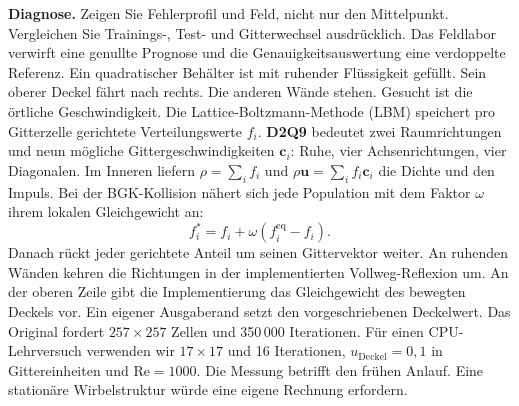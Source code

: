 \par\textsf{\bfseries\color{sea}Diagnose.} Zeigen Sie Fehlerprofil und Feld, nicht nur den Mittelpunkt. Vergleichen Sie Trainings-, Test- und Gitterwechsel ausdrücklich. Das Feldlabor verwirft eine genullte Prognose und die Genauigkeitsauswertung eine verdoppelte Referenz.
Ein quadratischer Behälter ist mit ruhender Flüssigkeit gefüllt. Sein oberer Deckel fährt nach rechts. Die anderen Wände stehen. Gesucht ist die örtliche Geschwindigkeit. Die Lattice-Boltzmann-Methode (LBM) speichert pro Gitterzelle gerichtete Verteilungswerte \(f_i\). \textbf{D2Q9} bedeutet zwei Raumrichtungen und neun mögliche Gittergeschwindigkeiten \(\mathbf c_i\): Ruhe, vier Achsenrichtungen, vier Diagonalen.
Im Inneren liefern \(\rho=\sum_i f_i\) und \(\rho\mathbf u=\sum_i f_i\mathbf c_i\) die Dichte und den Impuls. Bei der BGK-Kollision nähert sich jede Population mit dem Faktor \(\omega\) ihrem lokalen Gleichgewicht an:
\[
 f_i^*=f_i+\omega(f_i^{\mathrm{eq}}-f_i).
\]
Danach rückt jeder gerichtete Anteil um seinen Gittervektor weiter. An ruhenden Wänden kehren die Richtungen in der implementierten Vollweg-Reflexion um. An der oberen Zeile gibt die Implementierung das Gleichgewicht des bewegten Deckels vor. Ein eigener Ausgaberand setzt den vorgeschriebenen Deckelwert.
Das Original fordert \(257\times257\) Zellen und 350\,000 Iterationen. Für einen CPU-Lehrversuch verwenden wir \(17\times17\) und 16 Iterationen, \(u_\mathrm{Deckel}=0{,}1\) in Gittereinheiten und \(\mathrm{Re}=1000\). Die Messung betrifft den frühen Anlauf. Eine stationäre Wirbelstruktur würde eine eigene Rechnung erfordern.

